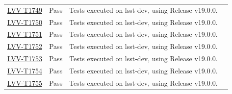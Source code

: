 \documentclass[DM,STR,toc]{lsstdoc}
\begin{document}
\begin{longtable}{p{2cm}p{2.5cm}p{9cm}p{2.5cm}}
\begin{minipage}[]{9cm}
    \medskip
    \end{minipage}
    &
    \\\hline
\href{https://jira.lsstcorp.org/secure/Tests.jspa#/testCase/LVV-T1749}{LVV-T1749}
    & Pass &
    \begin{minipage}[]{9cm}
    \smallskip
     Tests executed on lsst-dev, using Release v19.0.0.

    \medskip
    \end{minipage}
    &
    \\\hline
\href{https://jira.lsstcorp.org/secure/Tests.jspa#/testCase/LVV-T1750}{LVV-T1750}
    & Pass &
    \begin{minipage}[]{9cm}
    \smallskip
     Tests executed on lsst-dev, using Release v19.0.0.

    \medskip
    \end{minipage}
    &
    \\\hline
\href{https://jira.lsstcorp.org/secure/Tests.jspa#/testCase/LVV-T1751}{LVV-T1751}
    & Pass &
    \begin{minipage}[]{9cm}
    \smallskip
     Tests executed on lsst-dev, using Release v19.0.0.

    \medskip
    \end{minipage}
    &
    \\\hline
\href{https://jira.lsstcorp.org/secure/Tests.jspa#/testCase/LVV-T1752}{LVV-T1752}
    & Pass &
    \begin{minipage}[]{9cm}
    \smallskip
     Tests executed on lsst-dev, using Release v19.0.0.

    \medskip
    \end{minipage}
    &
    \\\hline
\href{https://jira.lsstcorp.org/secure/Tests.jspa#/testCase/LVV-T1753}{LVV-T1753}
    & Pass &
    \begin{minipage}[]{9cm}
    \smallskip
     Tests executed on lsst-dev, using Release v19.0.0.

    \medskip
    \end{minipage}
    &
    \\\hline
\href{https://jira.lsstcorp.org/secure/Tests.jspa#/testCase/LVV-T1754}{LVV-T1754}
    & Pass &
    \begin{minipage}[]{9cm}
    \smallskip
     Tests executed on lsst-dev, using Release v19.0.0.

    \medskip
    \end{minipage}
    &
    \\\hline
\href{https://jira.lsstcorp.org/secure/Tests.jspa#/testCase/LVV-T1755}{LVV-T1755}
    & Pass &
    \begin{minipage}[]{9cm}
    \smallskip
     Tests executed on lsst-dev, using Release v19.0.0.


\end{minipage}
\end{longtable}
\end{document}
